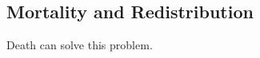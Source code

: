 \documentclass[BufferStockTheory]{subfiles}
\begin{document}
\begin{comment}
  \hypertarget{Consumption-and-Income-Growth-at-the-Household-Level}{}
  \subsection{Identical Growth in Income, Consumption, and Wealth}\label{subsec:cGroEqPGroIndQ}

  Unfortunately, the {\GICNrm} condition that we imposed which yielded all of these intuitive propositions at once is rather restrictive.  Modeling experience indicates that it is not always possible to find plausible combinations of parameter values that satisfy that condition.  Furthermore, while the {\GIC} is a considerably looser condition, as noted above (and as

\end{comment}


\hypertarget{Mortality-And-Redistribution}{}
\subsection{Mortality and Redistribution}\label{sec:Mortality-And-Redistribution}

Death can solve this problem.

\hypertarget{Blanchard-Lives}{}
\end{document}
